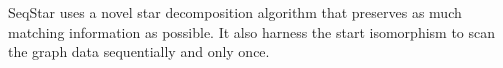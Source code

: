 
SeqStar uses a novel star decomposition algorithm that preserves as much matching information as possible.
It also harness the start isomorphism to scan the graph data sequentially and only once.

